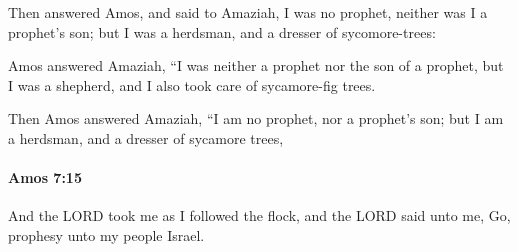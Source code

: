 			\begin{versebox}
					\item[BHS] 
					\item[LXX] 
					\item[ASV] Then answered Amos, and said to Amaziah, I was no prophet, neither was I a prophet's son; but I was a herdsman, and a dresser of sycomore-trees:
					\item[NIV] Amos answered Amaziah, “I was neither a prophet nor the son of a prophet, but I was a shepherd, and I also took care of sycamore-fig trees.
					\item[NRSV] Then Amos answered Amaziah, “I am no prophet, nor a prophet’s son; but I am a herdsman, and a dresser of sycamore trees,
			\end{versebox}

		\paragraph{Amos 7:15} %
			\label{AMOS-7-15}

			And the LORD took me as I followed the flock, and the LORD said unto me, Go, prophesy unto my people Israel.

